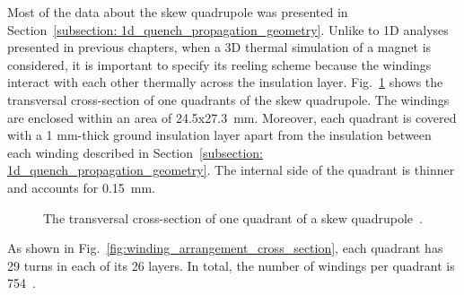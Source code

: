 
Most of the data about the skew quadrupole was presented in Section~\ref{subsection: 1d_quench_propagation_geometry}. Unlike to 1D analyses presented in previous chapters, when a 3D thermal simulation of a magnet is considered, it is important to specify its reeling scheme because the windings interact with each other thermally across the insulation layer. Fig.~\ref{fig:skew_quad_transversal_cross_section} shows the transversal cross-section of one quadrants of the skew quadrupole. The windings are enclosed within an area of 24.5x27.3~mm. Moreover, each quadrant is covered with a 1 mm-thick ground insulation layer apart from the insulation between each winding described in Section~\ref{subsection: 1d_quench_propagation_geometry}. The internal side of the quadrant is thinner and accounts for 0.15~mm.

\begin{figure}[H]
    \centering
    \caption{The transversal cross-section of one quadrant of a skew quadrupole~\cite{marco_prioli_mails}.}
    \label{fig:skew_quad_transversal_cross_section}
\end{figure}

As shown in Fig.~\ref{fig:winding_arrangement_cross_section}, each quadrant has 29 turns in each of its 26 layers. In total, the number of windings per quadrant is 754~\cite{hl_lhc_tech_design_report_v01, marco_prioli_mails}.

